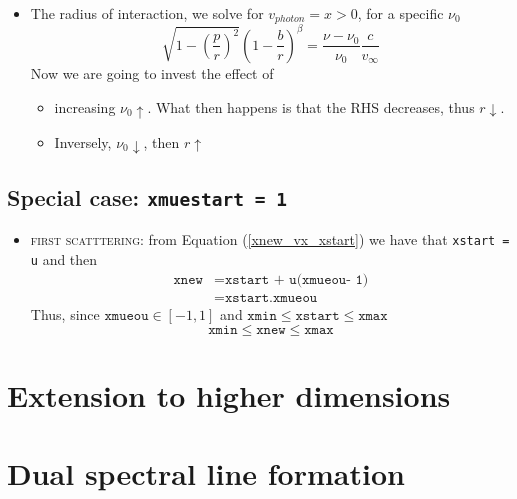 \documentclass[../main/main.tex]{subfiles}
\begin{document}
\begin{itemize}
\begin{itemize}
\item The radius of interaction, we solve for $v_{photon} = x > 0$, for a specific $\nu_0$
\begin{equation}
\sqrt{1-\left(\frac{p}{r}\right)^2} \left( 1- \frac{b}{r} \right)^{\beta} = \frac{\nu - \nu_0}{\nu_0} \frac{c}{v_{\infty}}
\end{equation}
Now we are going to invest the effect of 
\begin{itemize}
\item increasing $\nu_0 \uparrow$. What then happens is that the RHS decreases, thus $r \downarrow$. 
\item Inversely, $\nu_0 \downarrow$, then $r \uparrow$
\end{itemize}
\end{itemize}

\end{itemize}




\newpage
\subsection{Special case: \texttt{xmuestart = 1}}
\begin{itemize}
\item \textsc{first scatttering}: from Equation (\ref{xnew_vx_xstart}) we have that \texttt{xstart = u} and then
\begin{equation}
\begin{aligned}
\texttt{xnew} &= \texttt{xstart + u(xmueou- 1)} \\
&= \texttt{xstart.xmueou}
\end{aligned}
\end{equation}
Thus, since $\texttt{xmueou} \in [-1,1]$ and $\texttt{xmin} \leq \texttt{xstart} \leq \texttt{xmax}$
\begin{equation}
\texttt{xmin} \leq \texttt{xnew} \leq \texttt{xmax}
\end{equation}

\end{itemize}

\newpage
\section{Extension to higher dimensions}

\newpage
\section{Dual spectral line formation}
\label{two_resonance_lines}
\end{document}
